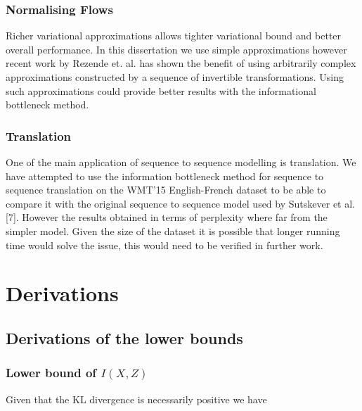 \documentclass[11pt,oneside,openright]{report}
\begin{document}
\subsection{Normalising Flows}
Richer variational approximations allows tighter variational bound and better overall performance. In this dissertation we use simple approximations however recent work by Rezende et. al. \cite{norm_flow} has shown the benefit of using arbitrarily complex approximations constructed by a sequence of invertible transformations. Using such approximations could provide better results with the informational bottleneck method.

\subsection{Translation}
One of the main application of sequence to sequence modelling is translation. We have attempted to use the information bottleneck method for sequence to sequence translation on the WMT'15 English-French dataset to be able to compare it with the original sequence to sequence model used by Sutskever et al. [7]. However the results obtained in terms of perplexity where far from the simpler model. Given the size of the dataset it is possible that longer running time would solve the issue, this would need to be verified in further work. 

\appendix
\chapter{Derivations}
\section{Derivations of the lower bounds}
\subsection{Lower bound of $I(X, Z)$}
\label{appendix:xz}
Given that the KL divergence is necessarily positive we have 
\end{document}
